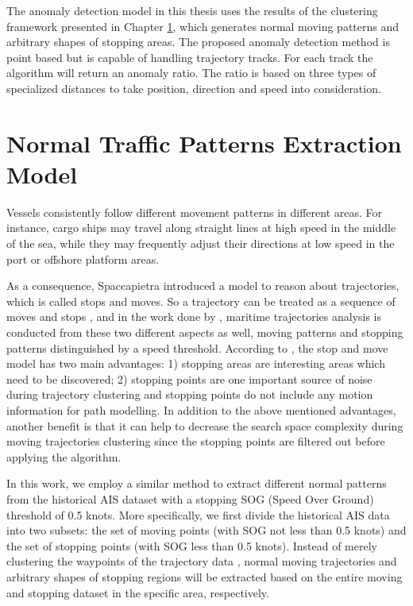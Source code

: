 \documentclass[12pt,glossary]{dalcsthesis}
\begin{document}
The anomaly detection model in this thesis uses the results of the clustering framework presented in Chapter \ref{ch:normal_traffic_extraction_model}, which generates normal moving patterns and arbitrary shapes of stopping areas.
The proposed anomaly detection method is point based but is capable of handling trajectory tracks. For each track the algorithm will return an anomaly ratio. The ratio is based on three types of specialized distances to take position, direction and speed into consideration.




\chapter{Normal Traffic Patterns Extraction Model}
\label{ch:normal_traffic_extraction_model}

Vessels consistently follow different movement patterns in different areas. For instance, cargo ships may travel along straight lines at high speed in the middle of the sea, while they may frequently adjust their directions at low speed in the port or offshore platform areas. 

As a consequence, Spaccapietra \cite{stopmove} introduced a model to reason about trajectories, which is called stops and moves. So a trajectory can be treated as a sequence of moves and stops \cite{stopmove}, and in the work done by \cite{vespe12}\cite{PallottaFramework}\cite{Nicolas}, maritime trajectories analysis is conducted from these two different aspects as well, moving patterns and stopping patterns distinguished by a speed threshold. According to \cite{Nicolas}, the stop and move model has two main advantages: 1) stopping areas are interesting areas which need to be discovered; 2) stopping points are one important source of noise during trajectory clustering and stopping points do not include any motion information for path modelling. In addition to the above mentioned advantages, another benefit is that it can help to decrease the search space complexity during moving trajectories clustering since the stopping points are filtered out before applying the algorithm. %

In this work, we employ a similar method to extract different normal patterns from the historical AIS dataset with a stopping SOG (Speed Over Ground) threshold of 0.5 knots. More specifically, we first divide the historical AIS data into two subsets: the set of moving points (with SOG not less than 0.5 knots) and the set of stopping points (with SOG less than 0.5 knots). Instead of merely clustering the waypoints of the trajectory data \cite{vespe12}\cite{PallottaFramework}, normal moving trajectories and arbitrary shapes of stopping regions will be extracted based on the entire moving and stopping dataset in the specific area, respectively.
\end{document}
